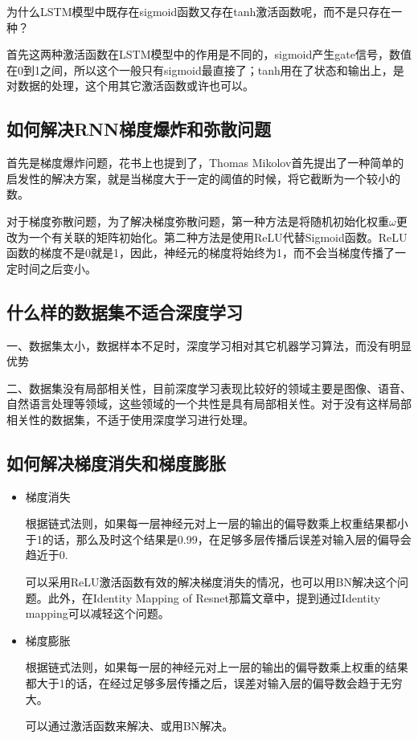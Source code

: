 为什么LSTM模型中既存在sigmoid函数又存在tanh激活函数呢，而不是只存在一种？

首先这两种激活函数在LSTM模型中的作用是不同的，sigmoid产生gate信号，数值在0到1之间，所以这个一般只有sigmoid最直接了；tanh用在了状态和输出上，是对数据的处理，这个用其它激活函数或许也可以。

\subsection{如何解决RNN梯度爆炸和弥散问题}

首先是梯度爆炸问题，花书上也提到了，Thomas Mikolov首先提出了一种简单的启发性的解决方案，就是当梯度大于一定的阈值的时候，将它截断为一个较小的数。

对于梯度弥散问题，为了解决梯度弥散问题，第一种方法是将随机初始化权重$\omega$更改为一个有关联的矩阵初始化。第二种方法是使用ReLU代替Sigmoid函数。ReLU函数的梯度不是0就是1，因此，神经元的梯度将始终为1，而不会当梯度传播了一定时间之后变小。

\subsection{什么样的数据集不适合深度学习}

一、数据集太小，数据样本不足时，深度学习相对其它机器学习算法，而没有明显优势

二、数据集没有局部相关性，目前深度学习表现比较好的领域主要是图像、语音、自然语言处理等领域，这些领域的一个共性是具有局部相关性。对于没有这样局部相关性的数据集，不适于使用深度学习进行处理。

\subsection{如何解决梯度消失和梯度膨胀}

\begin{itemize}
\item 梯度消失

根据链式法则，如果每一层神经元对上一层的输出的偏导数乘上权重结果都小于1的话，那么及时这个结果是0.99，在足够多层传播后误差对输入层的偏导会趋近于0.

可以采用ReLU激活函数有效的解决梯度消失的情况，也可以用BN解决这个问题。此外，在Identity Mapping of Resnet那篇文章中，提到通过Identity mapping可以减轻这个问题。

\item 梯度膨胀

根据链式法则，如果每一层的神经元对上一层的输出的偏导数乘上权重的结果都大于1的话，在经过足够多层传播之后，误差对输入层的偏导数会趋于无穷大。

可以通过激活函数来解决、或用BN解决。
\end{itemize}

